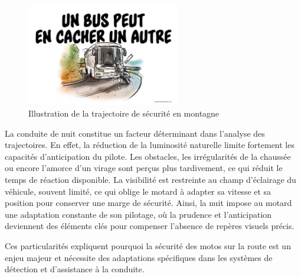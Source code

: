 \begin{figure}[H]
    \centering
    \includegraphics[width=0.6\textwidth]{etat_art/images/trajectoire-route-voie-bus-conduite_hd.jpg} 
    \caption{Illustration de la trajectoire de sécurité en montagne}
\end{figure}
La conduite de nuit constitue un facteur déterminant dans l’analyse des trajectoires. En effet, la réduction de la luminosité naturelle limite fortement les capacités d’anticipation du pilote. Les obstacles, les irrégularités de la chaussée ou encore l’amorce d’un virage sont perçus plus tardivement, ce qui réduit le temps de réaction disponible. La visibilité est restreinte au champ d’éclairage du véhicule, souvent limité, ce qui oblige le motard à adapter sa vitesse et sa position pour conserver une marge de sécurité. 
Ainsi, la nuit impose au motard une adaptation constante de son pilotage, où la prudence et l’anticipation deviennent des éléments clés pour compenser l’absence de repères visuels précis.\\
\vspace{0.5cm}

Ces particularités expliquent pourquoi la sécurité des motos sur la route est un enjeu majeur et nécessite des adaptations spécifiques dans les systèmes de détection et d’assistance à la conduite. 

